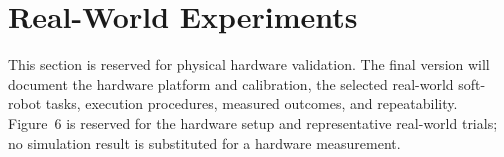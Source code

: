 \section{Real-World Experiments}
\label{sec:real-world}

This section is reserved for physical hardware validation. The final version will document the hardware platform and calibration, the selected real-world soft-robot tasks, execution procedures, measured outcomes, and repeatability. Figure~6 is reserved for the hardware setup and representative real-world trials; no simulation result is substituted for a hardware measurement.

